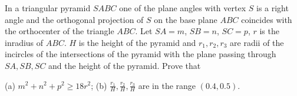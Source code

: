 In a triangular pyramid $SABC$ one of the plane angles with vertex $S$ is a right angle and the orthogonal projection of $S$ on the base plane $ABC$ coincides with the orthocenter of the triangle $ABC$. Let $SA=m$, $SB=n$, $SC=p$, $r$ is the inradius of $ABC$. $H$ is the height of the pyramid and $r_1,r_2,r_3$ are radii of the incircles of the intersections of the pyramid with the plane passing through $SA,SB,SC$ and the height of the pyramid. Prove that

(a) $m^2+n^2+p^2\ge18r^2$;
(b) $\frac{r_1}H,\frac{r_2}H,\frac{r_3}H$ are in the range $(0.4,0.5)$.